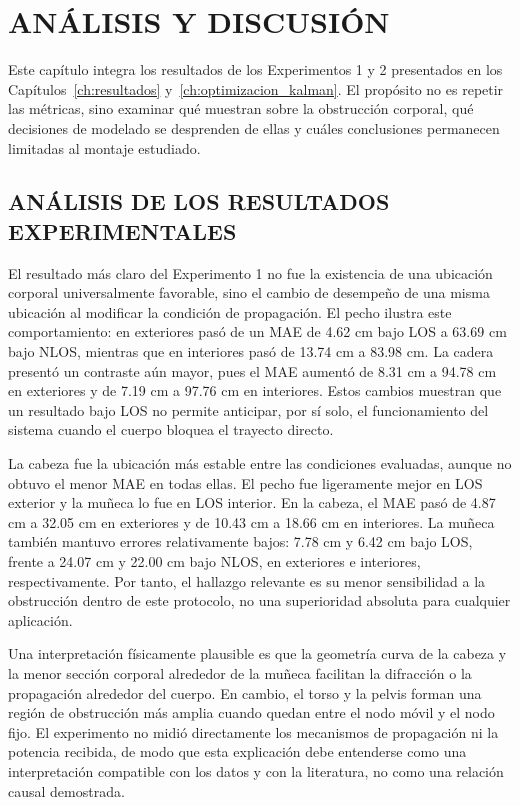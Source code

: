 \chapter{ANÁLISIS Y DISCUSIÓN}
\label{ch:analisis}

Este capítulo integra los resultados de los Experimentos 1 y 2 presentados en los Capítulos~\ref{ch:resultados} y~\ref{ch:optimizacion_kalman}. El propósito no es repetir las métricas, sino examinar qué muestran sobre la obstrucción corporal, qué decisiones de modelado se desprenden de ellas y cuáles conclusiones permanecen limitadas al montaje estudiado.

\section{ANÁLISIS DE LOS RESULTADOS EXPERIMENTALES}
\label{sec:interpretacion_patrones}

El resultado más claro del Experimento 1 no fue la existencia de una ubicación corporal universalmente favorable, sino el cambio de desempeño de una misma ubicación al modificar la condición de propagación. El pecho ilustra este comportamiento: en exteriores pasó de un MAE de 4.62 cm bajo LOS a 63.69 cm bajo NLOS, mientras que en interiores pasó de 13.74 cm a 83.98 cm. La cadera presentó un contraste aún mayor, pues el MAE aumentó de 8.31 cm a 94.78 cm en exteriores y de 7.19 cm a 97.76 cm en interiores. Estos cambios muestran que un resultado bajo LOS no permite anticipar, por sí solo, el funcionamiento del sistema cuando el cuerpo bloquea el trayecto directo.

La cabeza fue la ubicación más estable entre las condiciones evaluadas, aunque no obtuvo el menor MAE en todas ellas. El pecho fue ligeramente mejor en LOS exterior y la muñeca lo fue en LOS interior. En la cabeza, el MAE pasó de 4.87 cm a 32.05 cm en exteriores y de 10.43 cm a 18.66 cm en interiores. La muñeca también mantuvo errores relativamente bajos: 7.78 cm y 6.42 cm bajo LOS, frente a 24.07 cm y 22.00 cm bajo NLOS, en exteriores e interiores, respectivamente. Por tanto, el hallazgo relevante es su menor sensibilidad a la obstrucción dentro de este protocolo, no una superioridad absoluta para cualquier aplicación.

Una interpretación físicamente plausible es que la geometría curva de la cabeza y la menor sección corporal alrededor de la muñeca facilitan la difracción o la propagación alrededor del cuerpo. En cambio, el torso y la pelvis forman una región de obstrucción más amplia cuando quedan entre el nodo móvil y el nodo fijo. El experimento no midió directamente los mecanismos de propagación ni la potencia recibida, de modo que esta explicación debe entenderse como una interpretación compatible con los datos y con la literatura, no como una relación causal demostrada.

